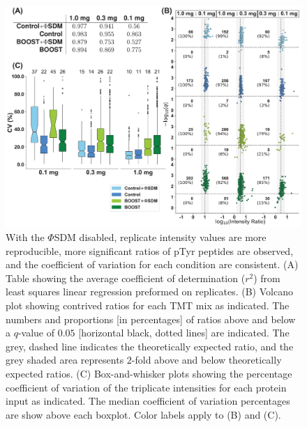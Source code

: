 \documentclass[journal=jprobs,manuscript=article]{achemso}
\begin{document}
\begin{figure}[!h]
\centering
\includegraphics[width=170mm]{figures/main_figs/accuracy_and_precision.pdf}
\caption{With the $\Phi$SDM disabled, replicate intensity values are more reproducible, more significant ratios of pTyr peptides are observed, and the coefficient of variation for each condition are consistent. (A) Table showing the average coefficient of determination ($r^{2}$) from least squares linear regression preformed on replicates. (B) Volcano plot showing contrived ratios for each TMT mix as indicated. The numbers and proportions [in percentages] of ratios above and below a $q$-value of $0.05$ [horizontal black, dotted lines] are indicated. The grey, dashed line indicates the theoretically expected ratio, and the grey shaded area represents $2$-fold above and below theoretically expected ratios. (C) Box-and-whisker plots showing the percentage coefficient of variation of the triplicate intensities for each protein input as indicated. The median coefficient of variation percentages are show above each boxplot. Color labels apply to (B) and (C).}\label{accuracy_and_precision}
\end{figure}
\end{document}
